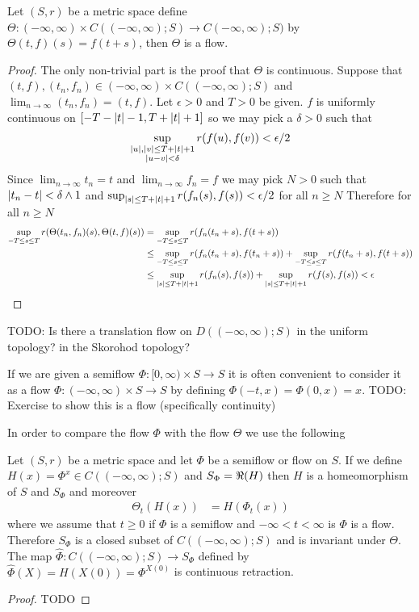 \begin{prop}Let $(S,r)$ be a metric space define $\Theta : (-\infty, \infty) \times C((-\infty, \infty); S) \to C (-\infty, \infty); S)$ by $\Theta(t,f)(s) =f(t+s)$, then $\Theta$ is a flow.
\end{prop}
\begin{proof}
The only non-trivial part is the proof that $\Theta$ is continuous.  Suppose that $(t, f), (t_n,f_n) \in  (-\infty, \infty) \times C((-\infty, \infty); S)$ and $\lim_{n \to \infty} (t_n, f_n) = (t,f)$.  Let $\epsilon > 0$ and $T > 0$ be given.  $f$ is uniformly continuous on $[-T-\left \vert t \right \vert-1,T+\left \vert t \right \vert+1]$ so we may pick a $\delta > 0$ such that 
\begin{align*}
\sup_{\substack{\left \vert u \right \vert, \left \vert v \right \vert \leq T + \left \vert t \right \vert+1 \\ \left \vert u-v \right \vert < \delta}} r(f(u), f(v)) < \epsilon/2
\end{align*}
Since $\lim_{n \to \infty} t_n = t$ and $\lim_{n \to \infty} f_n = f$ we may pick $N > 0$ such that $\left \vert t_n - t \right \vert < \delta \wedge 1$ and $\sup_{\left \vert s \right \vert \leq T + \left \vert t \right \vert + 1} r(f_n(s), f(s)) < \epsilon/2$ for all $n \geq N$
Therefore for all $n \geq N$
\begin{align*}
\sup_{-T \leq s \leq T} r(\Theta(t_n, f_n)(s), \Theta(t,f)(s)) &= \sup_{-T \leq s \leq T} r(f_n(t_n +s), f(t+s)) \\
&\leq \sup_{-T \leq s \leq T} r(f_n(t_n +s), f(t_n+s)) + \sup_{-T \leq s \leq T} r(f(t_n +s), f(t+s)) \\
&\leq \sup_{\left \vert s \right \vert \leq T+\left \vert t \right \vert+1} r(f_n(s), f(s)) + \sup_{\left \vert s \right \vert \leq T+\left \vert t \right \vert+1} r(f(s), f(s)) < \epsilon \\
\end{align*}
\end{proof}

TODO: Is there a translation flow on $D((-\infty, \infty); S)$ in the uniform topology?  in the Skorohod topology?

If we are given a semiflow $\Phi : [0,\infty) \times S \to S$ it is often convenient to consider it as a flow $\Phi : (-\infty,\infty) \times S \to S$ by defining $\Phi(-t,x) = \Phi(0,x) = x$.  TODO: Exercise to show this is a flow (specifically continuity)

In order to compare the flow $\Phi$ with the flow $\Theta$ we use the following
\begin{prop}Let $(S,r)$ be a metric space and let $\Phi$ be a semiflow or flow on $S$.  If we define $H(x) = \Phi^x \in C((-\infty, \infty); S)$ and $S_\Phi = \Re(H)$ then $H$ is a homeomorphism of $S$ and $S_\Phi$ and moreover
\begin{align*}
\Theta_t (H(x)) &= H(\Phi_t(x))
\end{align*}
where we assume that $t \geq 0$ if $\Phi$ is a semiflow and $-\infty < t < \infty$ is $\Phi$ is a flow.  Therefore $S_\Phi$ is a closed subset of $C((-\infty, \infty); S)$ and is invariant under $\Theta$.  The map $\hat{\Phi} : C((-\infty, \infty);S) \to S_\Phi$ defined by $\hat{\Phi}(X) = H(X(0)) = \Phi^{X(0)}$ is continuous retraction.
\end{prop}
\begin{proof}
TODO
\end{proof}

